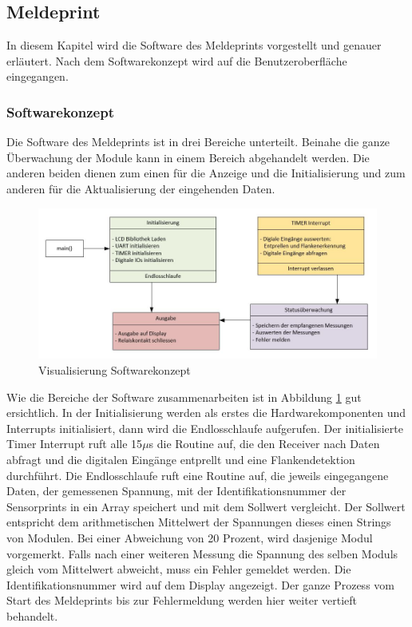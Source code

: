 \subsection{Meldeprint}
In diesem Kapitel wird die Software des Meldeprints vorgestellt und genauer erläutert. Nach dem Softwarekonzept wird auf die Benutzeroberfläche eingegangen. 
\subsubsection{Softwarekonzept}
Die Software des Meldeprints ist in drei Bereiche unterteilt. Beinahe die ganze Überwachung der Module kann in einem Bereich abgehandelt werden. Die anderen beiden dienen zum einen für die Anzeige und die Initialisierung und zum anderen für die Aktualisierung der eingehenden Daten.

\begin{figure}[htbp] 
  \centering
     \includegraphics[width=1\textwidth]{graphics/reportboard-software-river}
  \caption{Visualisierung Softwarekonzept}
  \label{fig:reportboard-software-river}
\end{figure}

Wie die Bereiche der Software zusammenarbeiten ist in Abbildung \ref{fig:reportboard-software-river} gut ersichtlich. In der Initialisierung werden als erstes die Hardwarekomponenten und Interrupts initialisiert, dann wird die Endlosschlaufe aufgerufen.
\newline
Der initialisierte Timer Interrupt ruft alle 15$\mu$s die Routine auf, die den Receiver nach Daten abfragt und die digitalen Eingänge entprellt und eine Flankendetektion durchführt.
\newline
Die Endlosschlaufe ruft eine Routine auf, die jeweils eingegangene Daten, der gemessenen Spannung, mit der Identifikationsnummer der Sensorprints in ein Array speichert und mit dem Sollwert vergleicht. Der Sollwert entspricht dem arithmetischen Mittelwert der Spannungen dieses einen Strings von Modulen. Bei einer Abweichung von 20 Prozent, wird dasjenige Modul vorgemerkt. Falls nach einer weiteren Messung die Spannung des selben Moduls gleich vom Mittelwert abweicht, muss ein Fehler gemeldet werden. Die Identifikationsnummer wird auf dem Display angezeigt. Der ganze Prozess vom Start des Meldeprints bis zur Fehlermeldung werden hier weiter vertieft behandelt.

